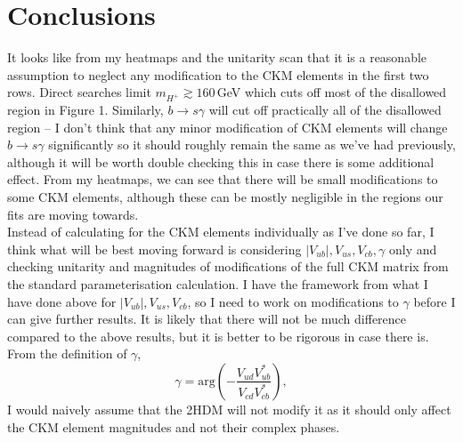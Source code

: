 \documentclass[11pt]{article}
\begin{document}
\section{Conclusions}
It looks like from my heatmaps and the unitarity scan that it is a reasonable assumption to neglect any modification to the CKM elements in the first two rows.
Direct searches limit $m_{H^+}\gtrsim160\,$GeV which cuts off most of the disallowed region in Figure 1.
Similarly, $b\to s\gamma$ will cut off practically all of the disallowed region -- I don't think that any minor modification of CKM elements will change $b\to s\gamma$ significantly so it should roughly remain the same as we've had previously, although it will be worth double checking this in case there is some additional effect.
From my heatmaps, we can see that there will be small modifications to some CKM elements, although these can be mostly negligible in the regions our fits are moving towards.\\ 
Instead of calculating for the CKM elements individually as I've done so far, I think what will be best moving forward is considering $|V_{ub}|,V_{us},V_{cb},\gamma$ only and checking unitarity and magnitudes of modifications of the full CKM matrix from the standard parameterisation calculation.
I have the framework from what I have done above for $|V_{ub}|,V_{us},V_{cb}$, so I need to work on modifications to $\gamma$ before I can give further results.
It is likely that there will not be much difference compared to the above results, but it is better to be rigorous in case there is.
From the definition of $\gamma$,
\begin{equation*}
    \gamma = \text{arg}\left(-\frac{V_{ud}V_{ub}^*}{V_{cd}V_{cb}^*}\right),
\end{equation*}
I would naively assume that the 2HDM will not modify it as it should only affect the CKM element magnitudes and not their complex phases.
\end{document}
